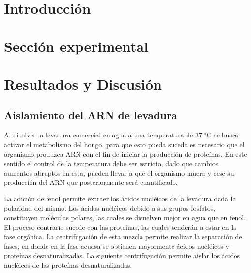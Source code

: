 \documentclass[fleqn,10pt]{SelfArx}
\begin{document}
\flushbottom %

\maketitle %

\thispagestyle{empty} %




\section*{Introducci\'on} %
	
\section{Secci\'on experimental}
	
\section{Resultados y Discusi\'on}
	\subsection{Aislamiento del ARN de levadura}
		Al disolver la levadura comercial en agua a una temperatura de 37 $^\circ$C se busca activar el metabolismo del hongo, para que esto pueda suceda es necesario que el organismo produzca ARN con el fin de iniciar la producci\'on de prote\'inas. En este sentido el control de la temperatura debe ser estricto, dado que cambios aumentos abruptos en esta, pueden llevar a que el organismo muera y cese su producci\'on del ARN que posteriormente ser\'a cuantificado.
		
		La adici\'on de fenol permite extraer los \'acidos nucl\'eicos de la levadura dada la polaridad del mismo. Los \'acidos nucl\'eicos debido a sus grupos fosfatos, constituyen mol\'eculas polares, las cuales se disuelven mejor en agua que en fenol. El proceso contrario sucede con las prote\'inas, las cuales tender\'an a estar en la fase org\'anica. La centrifugaci\'on de esta mezcla permite realizar la separaci\'on de fases, en donde en la fase acuosa se obtienen mayormente \'acidos nucl\'eicos y prote\'inas desnaturalizadas. La siguiente centrifugaci\'on permite aislar los \'acidos nucl\'eicos de las prote\'inas desnaturalizadas.
		
\end{document}
